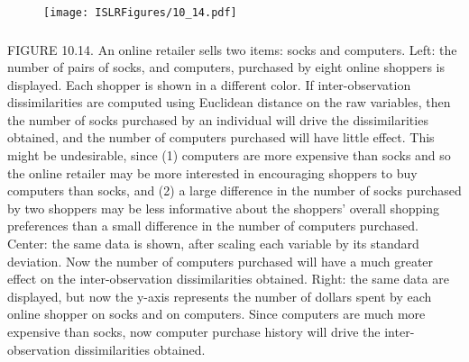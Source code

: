 \documentclass{beamer}
\begin{document}
            \begin{frame}
            	\frametitle{ }
            	\begin{figure}
            		\centering
            		\texttt{[image: ISLRFigures/10\_14.pdf]}
            	 
            	\end{figure}
            \end{frame}
            
               \begin{frame}
               	\frametitle{}
              {\scriptsize  
               	  FIGURE 10.14. An  online retailer sells two items: socks and computers.
               	  Left: the number of pairs of socks, and computers, purchased by eight online shoppers
               	  is displayed. Each shopper is shown in a different color. If inter-observation
               	  dissimilarities are computed using Euclidean distance on the raw variables, then
               	  the number of socks purchased by an individual will drive the dissimilarities obtained,
               	  and the number of computers purchased will have little effect. This might be
               	  undesirable, since (1) computers are more expensive than socks and so the online
               	  retailer may be more interested in encouraging shoppers to buy computers than
               	  socks, and (2) a large difference in the number of socks purchased by two shoppers
               	  may be less informative about the shoppers’ overall shopping preferences than a
               	  small difference in the number of computers purchased. Center: the same data
               	  is shown, after scaling each variable by its standard deviation. Now the number
               	  of computers purchased will have a much greater effect on the inter-observation
               	  dissimilarities obtained. Right: the same data are displayed, but now the y-axis
               	  represents the number of dollars spent by each online shopper on socks and on
               	  computers. Since computers are much more expensive than socks, now computer
               	  purchase history will drive the inter-observation dissimilarities obtained.
               	}
               	   
               		  \end{frame} 
               		  
\end{document}
